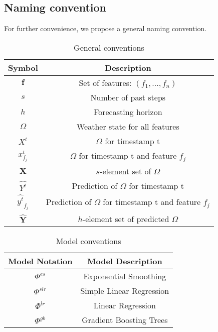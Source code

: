 \subsection{Naming convention}
 For further convenience, we propose a general naming convention. 
 \begin{table}[!h]
    \centering
     \begin{tabular}{|c|c|}
        \hline
        Symbol & Description \\
        \hline
        $\mathbf{f}$ & Set of features: $(f_1,..., f_n)$ \\
        $s$ & Number of past steps \\
        $h$ & Forecasting horizon \\
        $\Omega$ & Weather state for all features \\
        $X^t$ & $\Omega$ for timestamp t\\
        $x^t_{f_j}$ & $\Omega$ for timestamp t and feature $f_j$ \\
        $\mathbf{X}$ & $s$-element set of $\Omega$  \\
        $\hat{Y^t}$ & Prediction of $\Omega$ for timestamp t \\
        $\hat{y^t}_{f_j}$ & Prediction of $\Omega$ for timestamp t and feature $f_j$ \\
        $\mathbf{\hat{Y}}$ & $h$-element set of predicted $\Omega$ \\
        \hline
    \end{tabular}
    \caption{General conventions}
 \end{table}
 
 
\begin{table}[!h]
    \centering
    \begin{tabular}{|c|c|}
        \hline
        Model Notation & Model Description \\
        \hline
        $\Phi^{es}$  & Exponential Smoothing \\
        $\Phi^{slr}$ & Simple Linear Regression \\
        $\Phi^{lr}$  & Linear Regression \\
        $\Phi^{gb}$ & Gradient Boosting Trees \\
        \hline
    \end{tabular}
\caption{Model conventions}
\end{table}


